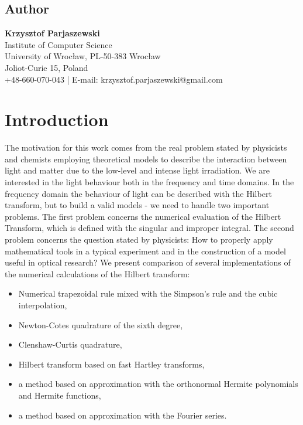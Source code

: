 \documentclass[12pt,twoside,a4paper]{article}
\numberwithin{equation}{subsection}
\numberwithin{figure}{subsection}
\begin{document}
\subsection*{Author}  \label{chap:abstract_author}

\textbf{Krzysztof Parjaszewski} \\
Institute of Computer Science \\
University of Wrocław, PL-50-383 Wrocław \\
Joliot-Curie 15, Poland \\
+48-660-070-043 | E-mail: krzysztof.parjaszewski@gmail.com

\section{Introduction} \label{chap:introduction}

The motivation for this work comes from the real problem stated by physicists and chemists employing theoretical models to describe the interaction between light and matter due to the low-level and intense light irradiation. We are interested in the light behaviour both in the frequency and time domains. In the frequency domain the behaviour of light can be described with the Hilbert transform, but to build a valid models - we need to handle two important problems. The first problem concerns the numerical evaluation of the Hilbert Transform, which is defined with the singular and improper integral. The second problem concerns the question stated by physicists: How to properly apply mathematical tools in a typical experiment and in the construction of a model useful in optical research? We present comparison of several implementations of the numerical calculations of the Hilbert transform:

\begin{itemize} \label{used_methods}
 \item Numerical trapezoidal rule mixed with the Simpson's rule and the cubic interpolation,
 \item Newton-Cotes quadrature of the sixth degree,
 \item Clenshaw-Curtis quadrature,
 \item Hilbert transform based on fast Hartley transforms,
 \item a method based on approximation with the orthonormal Hermite polynomials and Hermite functions,
 \item a method based on approximation with the Fourier series.
\end{itemize}
\end{document}
